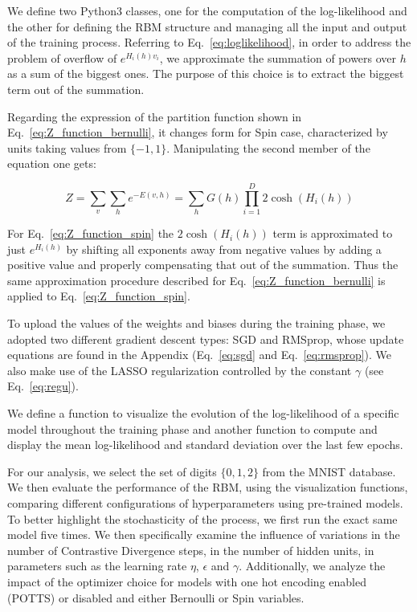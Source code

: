 \documentclass[prl,twocolumn]{revtex4-1}
\numberwithin{equation}{section}
\begin{document}
We define two Python3 classes, one for the computation of the log-likelihood and the other for defining the RBM structure and managing all the input and output of the training process. Referring to Eq.~\ref{eq:loglikelihood}, in order to address the problem of overflow of $e^{H_i(h)v_i}$, we approximate the summation of powers over $h$ as a sum of the biggest ones. The purpose of this choice is to extract the biggest term out of the summation.

Regarding the expression of the partition function shown in Eq.~\ref{eq:Z_function_bernulli}, it changes form for Spin case, characterized by units taking values from $\{-1,1\}$. Manipulating the second member of the equation one gets:

\begin{equation}
	Z=\sum_v\sum_h{e^{-E(v,h)}}=\sum_h{G(h)\prod_{i=1}^D{2\cosh(H_i(h))}}
	\label{eq:Z_function_spin}
\end{equation}

For Eq.~\ref{eq:Z_function_spin} the $2\cosh(H_i(h))$ term is approximated to just $e^{H_i(h)}$ by shifting all exponents away from negative values by adding a positive value and properly compensating that out of the summation. Thus the same approximation procedure described for Eq.~\ref{eq:Z_function_bernulli} is applied to Eq.~\ref{eq:Z_function_spin}.

To upload the values of the weights and biases during the training phase, we adopted two different gradient descent types: SGD and RMSprop, whose update equations are found in the Appendix (Eq.~\ref{eq:sgd} and Eq.~\ref{eq:rmsprop}). We also make use of the LASSO regularization controlled by the constant $\gamma$ (see Eq.~\ref{eq:regu}).

We define a function to visualize the evolution of the log-likelihood of a specific model throughout the training phase and another function to compute and display the mean log-likelihood and standard deviation over the last few epochs. 

For our analysis, we select the set of digits $\{0,1,2\}$ from the MNIST database. We then evaluate the performance of the RBM, using the visualization functions, comparing different configurations of hyperparameters using pre-trained models. To better highlight the stochasticity of the process, we first run the exact same model five times.  We then specifically examine the influence of variations in the number of Contrastive Divergence steps, in the number of hidden units, in parameters such as the learning rate $\eta$, $\epsilon$ and $\gamma$. Additionally, we analyze the impact of the optimizer choice for models with one hot encoding enabled (POTTS) or disabled and either Bernoulli or Spin variables.
\end{document}

